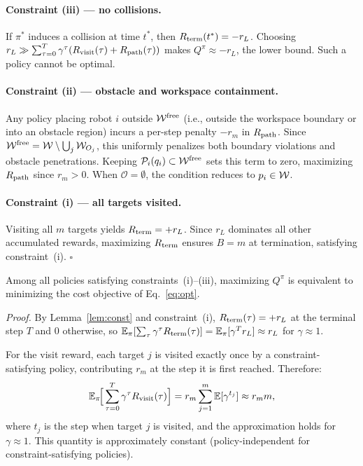 \documentclass{article}
\providecommand{\obst}{\mathcal{O}}
\providecommand{\free}{\mathrm{free}}
\begin{document}
\paragraph{Constraint (iii) --- no collisions.} If $\pi^*$ induces a collision at time $t^*$, then $R_{\mathrm{term}}(t^*) = -r_L$. Choosing $r_L \gg \sum_{\tau=0}^T \gamma^\tau (R_{\mathrm{visit}}(\tau) + R_{\mathrm{path}}(\tau))$ makes $Q^\pi \approx -r_L$, the lower bound. Such a policy cannot be optimal.

\paragraph{Constraint (ii) --- obstacle and workspace containment.} Any policy placing robot $i$ outside $\wspace^{\free}$ (i.e., outside the workspace boundary or into an obstacle region) incurs a per-step penalty $-r_m$ in $R_{\mathrm{path}}$. Since $\wspace^{\free} = \wspace \setminus \bigcup_j \wspace_{O_j}$, this uniformly penalizes both boundary violations and obstacle penetrations. Keeping $\mathcal{P}_i(q_i) \subset \wspace^{\free}$ sets this term to zero, maximizing $R_{\mathrm{path}}$ since $r_m > 0$. When $\obst = \emptyset$, the condition reduces to $p_i \in \mathcal{W}$.

\paragraph{Constraint (i) --- all targets visited.} Visiting all $m$ targets yields $R_{\mathrm{term}} = +r_L$. Since $r_L$ dominates all other accumulated rewards, maximizing $R_{\mathrm{term}}$ ensures $B = m$ at termination, satisfying constraint~(i). \hfill$\square$

\begin{lemma}
\label{lem:cost}
Among all policies satisfying constraints~\textnormal{(i)--(iii)}, maximizing $Q^\pi$ is equivalent to minimizing the cost objective of Eq.~\eqref{eq:opt}.
\end{lemma}

\textit{Proof.} By Lemma~\ref{lem:const} and constraint~(i), $R_{\mathrm{term}}(\tau) = +r_L$ at the terminal step $T$ and $0$ otherwise, so $\mathbb{E}_\pi[\sum_\tau \gamma^\tau R_{\mathrm{term}}(\tau)] = \mathbb{E}_\pi[\gamma^T r_L] \approx r_L$ for $\gamma \approx 1$.

For the visit reward, each target $j$ is visited exactly once by a constraint-satisfying policy, contributing $r_m$ at the step it is first reached. Therefore:
\begin{equation}
    \mathbb{E}_\pi\!\Big[\sum_{\tau=0}^T \gamma^\tau R_{\mathrm{visit}}(\tau)\Big]
    = r_m \sum_{j=1}^m \mathbb{E}[\gamma^{t_j}]
    \approx r_m m, \label{eq:visit_const}
\end{equation}
where $t_j$ is the step when target $j$ is visited, and the approximation holds for $\gamma \approx 1$. This quantity is approximately constant (policy-independent for constraint-satisfying policies).
\end{document}
